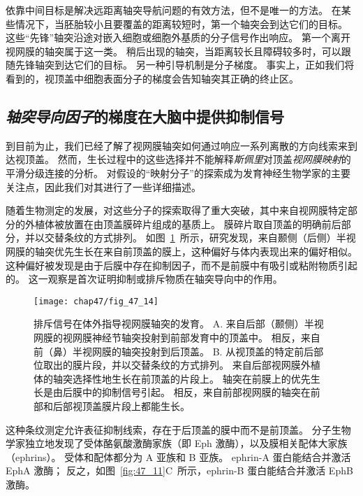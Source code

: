 依靠中间目标是解决远距离轴突导航问题的有效方法，但不是唯一的方法。
在某些情况下，当胚胎较小且要覆盖的距离较短时，第一个轴突会到达它们的目标。
这些“先锋”轴突沿途对嵌入细胞或细胞外基质的分子信号作出响应。
第一个离开视网膜的轴突属于这一类。
稍后出现的轴突，当距离较长且障碍较多时，可以跟随先锋轴突到达它们的目标。
另一种引导机制是分子梯度。
事实上，正如我们将看到的，视顶盖中细胞表面分子的梯度会告知轴突其正确的终止区。



\subsection{\textit{轴突导向因子}的梯度在大脑中提供抑制信号}

到目前为止，我们已经了解了视网膜轴突如何通过响应一系列离散的方向线索来到达视顶盖。
然而，生长过程中的这些选择并不能解释\textit{斯佩里}对顶盖\textit{视网膜映射}的平滑分级连接的分析。
对假设的“映射分子”的探索成为发育神经生物学家的主要关注点，因此我们对其进行了一些详细描述。


随着生物测定的发展，对这些分子的探索取得了重大突破，其中来自视网膜特定部分的外植体被放置在由顶盖膜碎片组成的基质上。
膜碎片取自顶盖的明确前后部分，并以交替条纹的方式排列。 
如图~\ref{fig:47_14}~所示，研究发现，来自颞侧（后侧）半视网膜的轴突优先生长在来自前顶盖的膜上，这种偏好与体内表现出来的偏好相似。
这种偏好被发现是由于后膜中存在抑制因子，而不是前膜中有吸引或粘附物质引起的。
这一观察是首次证明抑制或排斥物质在轴突导向中的作用。


\begin{figure}[htbp]
	\centering
	\texttt{[image: chap47/fig\_47\_14]}
	\caption{排斥信号在体外指导视网膜轴突的发育。
		A. 来自后部（颞侧）半视网膜的视网膜神经节轴突投射到前部发育中的顶盖中。
		相反，来自前（鼻）半视网膜的轴突投射到后顶盖。
		B. 从视顶盖的特定前后部位取出的膜片段，并以交替条纹的方式排列。
		来自后部视网膜外植体的轴突选择性地生长在前顶盖的片段上。
		轴突在前膜上的优先生长是由后膜中的抑制信号引起。
		相反，来自前部视网膜的轴突在前部和后部视顶盖膜片段上都能生长\cite{walter1987avoidance}。}
	\label{fig:47_14}
\end{figure}


这种条纹测定允许表征抑制线索，存在于后顶盖的膜中而不是前顶盖。
分子生物学家独立地发现了受体酪氨酸激酶家族（即 Eph 激酶），以及膜相关配体大家族（ephrins）。
受体和配体都分为 A 亚族和 B 亚族。
ephrin-A 蛋白能结合并激活 EphA 激酶；
反之，如图~\ref{fig:47_11}C~所示，ephrin-B 蛋白能结合并激活 EphB 激酶。


